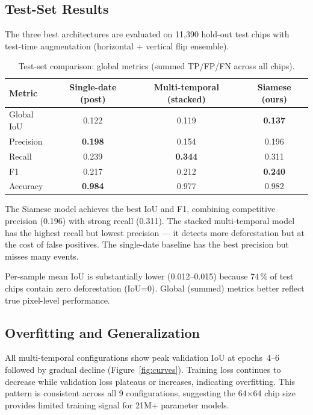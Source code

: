 \documentclass[10pt,a4paper,onecolumn]{article}
\begin{document}
\subsection{Test-Set Results}

The three best architectures are evaluated on 11,390 hold-out test
chips with test-time augmentation (horizontal + vertical flip
ensemble).

\begin{table}[ht]
\centering
\caption{Test-set comparison: global metrics (summed TP/FP/FN across all chips).}
\label{tab:results}
\begin{tabular}{lccc}
\toprule
Metric & Single-date (post) & Multi-temporal (stacked) & Siamese (ours) \\
\midrule
Global IoU   & 0.122 & 0.119 & \textbf{0.137} \\
Precision    & \textbf{0.198} & 0.154 & 0.196 \\
Recall       & 0.239 & \textbf{0.344} & 0.311 \\
F1           & 0.217 & 0.212 & \textbf{0.240} \\
Accuracy     & \textbf{0.984} & 0.977 & 0.982 \\
\bottomrule
\end{tabular}
\end{table}

The Siamese model achieves the best IoU and F1, combining competitive
precision (0.196) with strong recall (0.311).  The stacked
multi-temporal model has the highest recall but lowest precision ---
it detects more deforestation but at the cost of false positives.
The single-date baseline has the best precision but misses many
events.

Per-sample mean IoU is substantially lower (0.012--0.015) because
74\,\% of test chips contain zero deforestation (IoU=0).  Global
(summed) metrics better reflect true pixel-level performance.

\subsection{Overfitting and Generalization}

All multi-temporal configurations show peak validation IoU at
epochs~4--6 followed by gradual decline (Figure~\ref{fig:curves}).
Training loss continues to decrease while validation loss plateaus
or increases, indicating overfitting.  This pattern is consistent
across all 9 configurations, suggesting the 64$\times$64 chip size
provides limited training signal for 21M+ parameter models.
\end{document}
